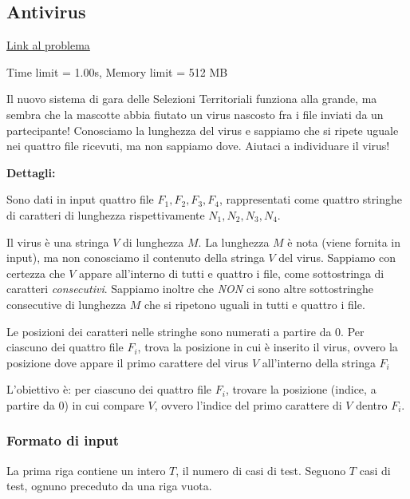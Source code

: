 \newpage
\subsection{Antivirus}
\href{https://territoriali.olinfo.it/task/antivirus}{Link al problema} 

\smallskip

\noindent Time limit = 1.00s, Memory limit = 512 MB

\bigskip

Il nuovo sistema di gara delle Selezioni Territoriali funziona alla grande, ma sembra che la mascotte abbia fiutato un virus nascosto fra i file inviati da un partecipante!  
Conosciamo la lunghezza del virus e sappiamo che si ripete uguale nei quattro file ricevuti, ma non sappiamo dove. Aiutaci a individuare il virus!

\medskip

\noindent\textbf{Dettagli:}

 Sono dati in input quattro file \(F_1, F_2, F_3, F_4\), rappresentati come quattro stringhe di caratteri di lunghezza rispettivamente \(N_1, N_2, N_3, N_4\).  

Il virus è una stringa \(V\) di lunghezza \(M\). La lunghezza \(M\) è nota (viene fornita in input), ma non conosciamo il contenuto della stringa \(V\) del virus.  
Sappiamo con certezza che \(V\) appare all'interno di tutti e quattro i file, come sottostringa di caratteri \emph{consecutivi}. Sappiamo inoltre che \emph{NON} ci sono altre sottostringhe consecutive di lunghezza \(M\) che si ripetono uguali in tutti e quattro i file.


Le posizioni dei caratteri nelle stringhe sono numerati a partire da \(0\). Per ciascuno dei quattro file \(F_i\), trova la posizione in cui è inserito il virus, ovvero la posizione dove appare il primo carattere del virus \(V\) all'interno della stringa \(F_i\)

L’obiettivo è: per ciascuno dei quattro file \(F_i\), trovare la posizione (indice, a partire da 0) in cui compare \(V\), ovvero l’indice del primo carattere di \(V\) dentro \(F_i\).


\subsubsection*{Formato di input}  

La prima riga contiene un intero \(T\), il numero di casi di test.  
Seguono \(T\) casi di test, ognuno preceduto da una riga vuota.  

